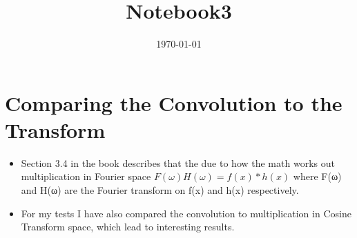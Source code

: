 \documentclass{article}
\date{\today}
\title{Notebook3}
\begin{document}
\maketitle
\tableofcontents

\section{Comparing the Convolution to the Transform}
\label{sec-1}
\begin{itemize}
\item Section 3.4 in the book describes that the due to how the math works
out multiplication in Fourier space $F(ω)H(ω) = f(x)*h(x)$ where F(ω) and
H(ω) are the Fourier transform on f(x) and h(x) respectively.
\item For my tests Ι have also compared the convolution to multiplication
in Cosine Transform space, which lead to interesting results.
\end{itemize}
\end{document}
